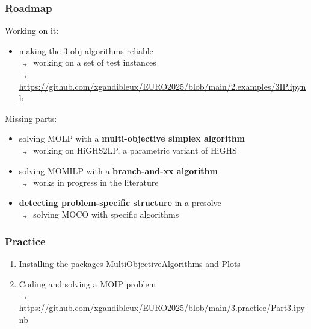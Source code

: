 \documentclass[]{beamer}
\begin{document}
\begin{frame}
  \frametitle{Roadmap}
\vspace{3mm}

Working on it:

\begin{itemize}
\item making the 3-obj algorithms reliable\\
$\drsh$ working on a set of test instances\\
$\drsh$ {\tiny \url{https://github.com/xgandibleux/EURO2025/blob/main/2.examples/3IP.ipynb}}
\end{itemize}
\bigskip
\pause

Missing parts:

\begin{itemize}
\item solving MOLP with a  \textbf{multi-objective simplex algorithm}\\
$\drsh$ working on HiGHS2LP, a parametric variant of HiGHS
\smallskip
\item solving MOMILP with a  \textbf{branch-and-xx algorithm}\\
$\drsh$ works in progress in the literature 
\smallskip
\item \textbf{detecting problem-specific structure} in a presolve\\
$\drsh$ solving MOCO with specific algorithms 
\end{itemize}


\end{frame}




% 
%

\begin{frame}
  \frametitle{Practice}
\vspace{3mm}

\begin{enumerate}
\item Installing the packages MultiObjectiveAlgorithms and Plots

\item Coding and solving a MOIP problem \\
$\drsh$ \tiny{\url{https://github.com/xgandibleux/EURO2025/blob/main/3.practice/Part3.ipynb}}
\vspace{3mm}

\end{enumerate}
\end{frame}
\end{document}
